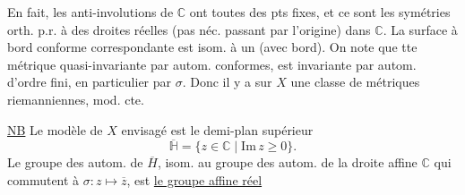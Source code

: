 En fait, les anti-involutions de $\mathbb C$ ont toutes des pts fixes, et ce sont les symétries orth. p.r. à des droites réelles (pas néc. passant par l'origine) dans $\mathbb C$. La surface à bord conforme correspondante est isom. à un  (avec bord). On note que tte métrique  quasi-invariante par autom. conformes, est invariante par autom. d'ordre fini, en particulier par $\sigma$. Donc il y a sur $X$ une classe  de métriques riemanniennes, mod. cte.

\uline{NB}  Le modèle de $X$ envisagé est le demi-plan supérieur 
\[
\overline{\mathbb H}=\{z\in\mathbb C\mid\mathrm{Im}\,z\geq0\}.
\]
Le groupe des autom. de $\overline H$, isom. au groupe des autom. de la droite affine $\mathbb C$ qui commutent à $\sigma:z\longmapsto\overline z$, est \uline{le groupe affine réel}
